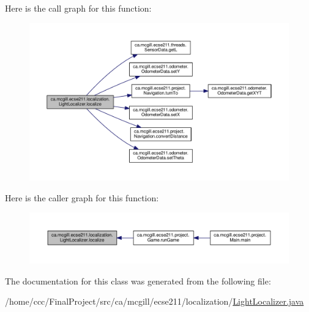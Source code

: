 Here is the call graph for this function\+:\nopagebreak
\begin{figure}[H]
\begin{center}
\leavevmode
\includegraphics[width=350pt]{classca_1_1mcgill_1_1ecse211_1_1localization_1_1_light_localizer_a9fc3d6cdd897e9db86fc9d71dc914863_cgraph}
\end{center}
\end{figure}
Here is the caller graph for this function\+:
\nopagebreak
\begin{figure}[H]
\begin{center}
\leavevmode
\includegraphics[width=350pt]{classca_1_1mcgill_1_1ecse211_1_1localization_1_1_light_localizer_a9fc3d6cdd897e9db86fc9d71dc914863_icgraph}
\end{center}
\end{figure}


The documentation for this class was generated from the following file\+:\begin{DoxyCompactItemize}
\item 
/home/ccc/\+Final\+Project/src/ca/mcgill/ecse211/localization/\hyperlink{_light_localizer_8java}{Light\+Localizer.\+java}\end{DoxyCompactItemize}
